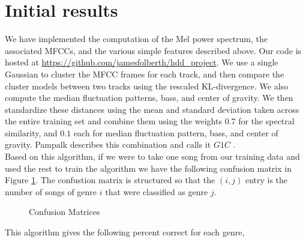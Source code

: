 \documentclass[12pt]{article}
\begin{document}
\section{Initial results}

We have implemented the computation of the Mel power spectrum, the associated MFCCs, and the various simple features described above.  Our code is hosted at \url{https://github.com/jamesfolberth/hdd_project}.  We use a single Gaussian to cluster the MFCC frames for each track, and then compare the cluster models between two tracks using the rescaled KL-divergence.  We also compute the median fluctuation patterns, bass, and center of gravity.  We then standardize these distances using the mean and standard deviation taken across the entire training set and combine them using the weights $0.7$ for the spectral similarity, and $0.1$ each for median fluctuation pattern, bass, and center of gravity.  Pampalk describes this combination and calls it $G1C$ \cite{pampalk:dissertation}.\\

Based on this algorithm, if we were to take one song from our training data and used the rest to train the algorithm we have the following confusion matrix in Figure {\ref{fig:confMat}}.  The confustion matrix is structured so that the $(i,j)$ entry is the number of songs of genre $i$ that were classified as genre $j$.

\begin{figure}[h!]
\centering
\caption{Confusion Matrices}
\label{fig:confMat}
\end{figure}

This algorithm gives the following percent correct for each genre, 
\end{document}
